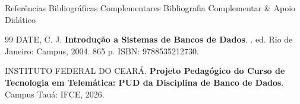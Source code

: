 \begin{frame}{Referências Bibliográficas Complementares}
  \alert{Bibliografia Complementar \& Apoio Didático}\par
  \vspace{0.2cm}
  \begin{thebibliography}{99}
    \footnotesize
    \setlength{\itemsep}{2.5mm}
      DATE, C. J.
      \newblock \textbf{Introdução a Sistemas de Bancos de Dados}.
      . ed. Rio de Janeiro: Campus, 2004. 865 p. ISBN: 9788535212730.

      INSTITUTO FEDERAL DO CEARÁ.
      \newblock \textbf{Projeto Pedagógico do Curso de Tecnologia em Telemática: PUD da Disciplina de Banco de Dados}.
      \newblock Campus Tauá: IFCE, 2026.
  \end{thebibliography}
\end{frame}
